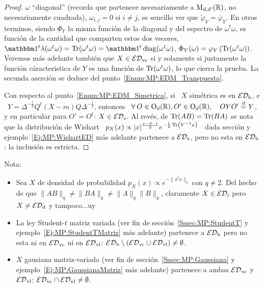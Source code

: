 \begin{proof}
  $\omega$    ``diagonal''    (recorda    que   partenece    necesariamente    a
  $\mathrm{M}_{d,d'}(\mathbb{R})$, \ie no necesariamente  cuadrada), \ie $\omega_{i,j} = 0$
  si   $i    \ne   j$,   es   sencillo   ver    que   $\widetilde{\varphi}_Y   =
  \overline{\varphi}_Y$. En  otros terminos, siendo $\Phi_Y$  la misma funci\'on
  de  la diagonal  y  del espectro  de  $\omega^t \omega$,  es  funci\'on de  la
  cantidad que comparten estos  dos vecores, \ie $\un^t \lambda(\omega^t \omega)
  = \Tr( \omega^t \omega) = \un^t \diag(\omega^t \omega)$, \ie $\Phi_Y(\omega) =
  \varphi_Y\left(  \operatorname{Tr}(\omega^t   \omega)  \right)$.   Veremos   m\'as  adelante
  tambi\'en  que $X \in  \mathcal{ED}_{\mathrm{vc}}$ si  y solamente  si justamente  la funci\'on
  c\'aracteristica de  $Y$ es una funci\'on  de $\operatorname{Tr}( \omega^t  \omega)$, lo que
  cierra   la  prueba.    \newline   La  secunda   aserci\'on   se  deduce   del
  punto~\ref{Enum:MP:EDM_Transpuesta}.

  Con respecto al punto~\ref{Enum:MP:EDM_Simetrica},  si \ $X$ sim\'etrica es en
  $\mathcal{ED}_{\mathrm{b}}$,  e  \  $Y  =  \Delta^{-\frac12} Q^t  (X-m)  Q  \Delta^{-\frac12}$,
  entonces \ $\forall \: O \in \mathrm{O}_d(\mathbb{R}), O' \in \mathrm{O}_d(\mathbb{R}), \quad O Y O'
  \stackrel{\mathrm{d}}{=} Y$, y en particular para $O' = O^t$: $X \in \mathcal{ED}_{\mathrm{s}}$. Al rev\'es, de
  $\operatorname{Tr}(A  B) = \operatorname{Tr}(B  A)$ se  nota que  la distribuci\'on  de Wishart  \ $p_X(x)
  \propto |x|^{\frac{\nu-d-1}{2}} e^{-\frac12 \operatorname{Tr}\left( V^{-1} x\right)}$ \ dada
  secci\'on   y  ejemplo~\ref{Ej:MP:WishartED}   m\'as   adelante  partenece   a
  $\mathcal{ED}_{\mathrm{s}}$, pero no esta en $\mathcal{ED}_{\mathrm{b}}$: la inclusi\'on es estricta.
\end{proof}
%
Nota:
%
\begin{itemize}
\item Sea $X$ de densidad de probabilidad $p_X(x) \propto e^{- \| x^t x \|_q}$ con $q \ne 2$. Del hecho de que $\| A B\|_q \ne \| B A \|_q \ne \|A\|_q \|B\|_q$, claramente $X \in \mathcal{ED}_{\mathrm{i}}$ pero $X \ne \mathcal{ED}_{\mathrm{d}}$ y tampoco...uy 
%
\item     La    ley     Student-$t$     matriz    variada     (ver    fin     de
  secci\'on~\ref{Sssec:MP:StudentT}  y  ejemplo~\ref{Ej:MP:StudentTMatriz} m\'as
  adelante)  partenece  a  $\mathcal{ED}_{\mathrm{b}}$ pero  no  esta  ni  en $\mathcal{ED}_{\mathrm{vc}}$  ni  en
  $\mathcal{ED}_{\mathrm{vl}}$: $\mathcal{ED}_{\mathrm{b}} \setminus \left(  \mathcal{ED}_{\mathrm{vc}} \cup \mathcal{ED}_{\mathrm{vl}} \right) \neq
  \emptyset$.
%
\item $X$ gausiana matriz-variada (ver fin de secci\'on~\ref{Sssec:MP:Gaussiana}
  y  ejemplo~\ref{Ej:MP:GaussianaMatriz}  m\'as   adelante)  partenece  a  ambas
  $\mathcal{ED}_{\mathrm{vc}}$ y $\mathcal{ED}_{\mathrm{vl}}$: $\mathcal{ED}_{\mathrm{vc}} \cap \mathcal{ED}_{\mathrm{vl}} \neq \emptyset$.
\end{itemize}
